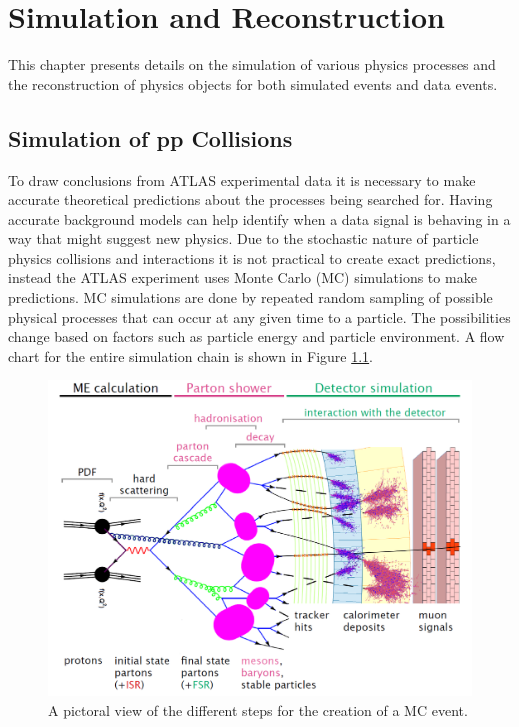 \chapter{Simulation and Reconstruction}
\label{ch:Simulation}

This chapter presents details on the simulation of various physics processes and the reconstruction of physics objects for both simulated events and data events.  

\section{Simulation of pp Collisions}
To draw conclusions from ATLAS experimental data it is necessary to make accurate theoretical predictions about the processes being searched for.  Having accurate background models can help identify when a data signal is behaving in a way that might suggest new physics.  Due to the stochastic nature of particle physics collisions and interactions it is not practical to create exact predictions, instead the ATLAS experiment uses Monte Carlo (MC) simulations to make predictions.  MC simulations are done by repeated random sampling of possible physical processes that can occur at any given time to a particle.  The possibilities change based on factors such as particle energy and particle environment.  A flow chart for the entire simulation chain is shown in Figure \ref{fig:SimMCFlow}. 

\begin{figure}[h!]
	\centering
	\includegraphics[width=\columnwidth]{../ThesisImages/Simulation/MCFlow.png}
	\caption[A pictoral view of the different steps for the creation of a MC event.]{A pictoral view of the different steps for the creation of a MC event. \cite{MaxThesis} 
	}
	\label{fig:SimMCFlow}
\end{figure}

